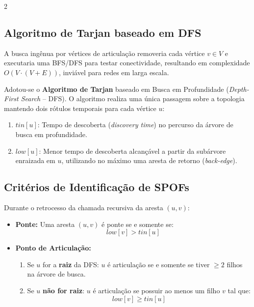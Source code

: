 \documentclass[10pt,a4paper]{article}
\begin{document}
\begin{multicols}{2}
\subsection{Algoritmo de Tarjan baseado em DFS}
A busca ingênua por vértices de articulação removeria cada vértice $v \in V$ e executaria uma BFS/DFS para testar conectividade, resultando em complexidade $O(V \cdot (V + E))$, inviável para redes em larga escala.

Adotou-se o \textbf{Algoritmo de Tarjan} baseado em Busca em Profundidade (\textit{Depth-First Search} -- DFS). O algoritmo realiza uma única passagem sobre a topologia mantendo dois rótulos temporais para cada vértice $u$:
\begin{enumerate}
    \setlength{\itemsep}{0pt}
    \item $tin[u]$: Tempo de descoberta (\textit{discovery time}) no percurso da árvore de busca em profundidade.
    \item $low[u]$: Menor tempo de descoberta alcançável a partir da subárvore enraizada em $u$, utilizando no máximo uma aresta de retorno (\textit{back-edge}).
\end{enumerate}

\subsection{Critérios de Identificação de SPOFs}
Durante o retrocesso da chamada recursiva da aresta $(u, v)$:
\begin{itemize}
    \setlength{\itemsep}{0pt}
    \item \textbf{Ponte:} Uma aresta $(u, v)$ é ponte se e somente se:
    \begin{equation}
        low[v] > tin[u]
    \end{equation}
    \item \textbf{Ponto de Articulação:}
    \begin{enumerate}
        \item Se $u$ for a \textbf{raiz} da DFS: $u$ é articulação se e somente se tiver $\ge 2$ filhos na árvore de busca.
        \item Se $u$ \textbf{não for raiz}: $u$ é articulação se possuir ao menos um filho $v$ tal que:
        \begin{equation}
            low[v] \ge tin[u]
        \end{equation}
    \end{enumerate}
\end{itemize}


\end{multicols}
\end{document}

